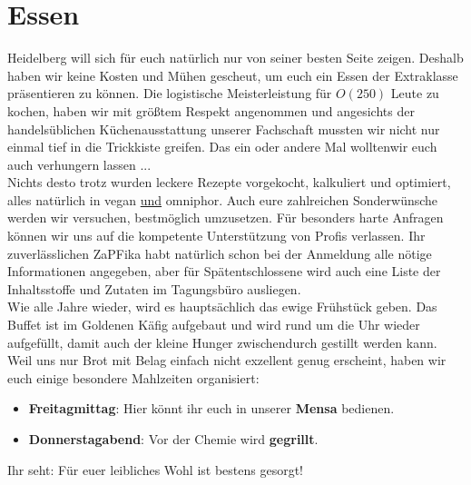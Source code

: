\section{Essen}
  Heidelberg will sich für euch natürlich nur von seiner besten Seite zeigen. Deshalb haben wir keine Kosten und Mühen gescheut,
  um euch ein Essen der Extraklasse präsentieren zu können.
  Die logistische Meisterleistung für $O(250)$ Leute zu kochen, haben wir mit größtem Respekt angenommen und
  angesichts der handelsüblichen Küchenausstattung unserer Fachschaft mussten wir nicht nur einmal tief in
  die Trickkiste greifen. Das ein oder andere Mal wolltenwir euch auch verhungern lassen ... \\
  Nichts desto trotz wurden leckere Rezepte vorgekocht, kalkuliert und optimiert, alles natürlich in vegan \underline{und} omniphor.
  Auch eure zahlreichen Sonderwünsche werden wir versuchen, bestmöglich umzusetzen. Für besonders harte Anfragen
  können wir uns auf die kompetente Unterstützung von Profis verlassen.
  Ihr zuverlässlichen ZaPFika habt natürlich schon bei der Anmeldung alle nötige Informationen angegeben,
  aber für Spätentschlossene wird auch eine Liste der Inhaltsstoffe und Zutaten im Tagungsbüro ausliegen. \\

  Wie alle Jahre wieder, wird es hauptsächlich das ewige Frühstück geben. Das Buffet ist im Goldenen
  Käfig aufgebaut und wird rund um die Uhr wieder aufgefüllt, damit auch der kleine
  Hunger zwischendurch gestillt werden kann.
  Weil uns nur Brot mit Belag einfach nicht exzellent genug erscheint, haben wir euch einige besondere Mahlzeiten organisiert:
  \begin{itemize}
    \item \textbf{Freitagmittag}: Hier könnt ihr euch in unserer \textbf{Mensa} bedienen.
    \item \textbf{Donnerstagabend}: Vor der Chemie wird \textbf{gegrillt}.
  \end{itemize}
  Ihr seht: Für euer leibliches Wohl ist bestens gesorgt!

